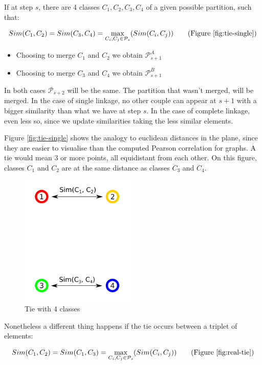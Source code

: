 \documentclass[12pt,a4paper]{article}
\begin{document}
If at step $s$, there are 4 classes $C_1, C_2, C_3, C_4$ of a given
possible partition, such that:

$$ Sim(C_1, C_2) = Sim(C_3, C_4) = \max_{C_i, C_j \in
  \mathcal{P}_s}(Sim(C_i, C_j))\ \ \ \ \ \ (\mathrm{Figure}\
\ref{fig:tie-single})  $$

\begin{itemize}
\item Choosing to merge $C_1$ and $C_2$ we obtain
  $\mathcal{P}_{s+1}^{A}$
\item Choosing to merge $C_3$ and $C_4$ we obtain
  $\mathcal{P}_{s+1}^{B}$
\end{itemize}

In both cases $\mathcal{P}_{s+2}$ will be the same. The partition that
wasn't merged, will be merged. In the case of single linkage, no other
couple can appear at $s+1$ with a bigger similarity than what we have
at step $s$. In the case of complete linkage, even less so, since we
update similarities taking the less similar elements.

Figure \ref{fig:tie-single} shows the analogy to euclidean distances
in the plane, since they are easier to visualise than the computed
Pearson correlation for graphs. A tie would mean 3 or more points, all
equidistant from each other. On this figure, classes $C_1$ and $C_2$
are at the same distance as classes $C_3$ and $C_4$.

\begin{figure}[ht!]
  \centering
  \includegraphics[width=0.5\textwidth]{img/tie.png}
  \caption{Tie with 4 classes}
  \label{fig:tie4}
\end{figure}

Nonetheless a different thing happens if the tie occurs between a
triplet of elements:

$$ Sim(C_1, C_2) = Sim(C_1, C_3) = \max_{C_i, C_j \in
  \mathcal{P}_s}(Sim(C_i, C_j))\ \ \ \ \ \ (\mathrm{Figure}\
\ref{fig:real-tie})  $$
\end{document}
